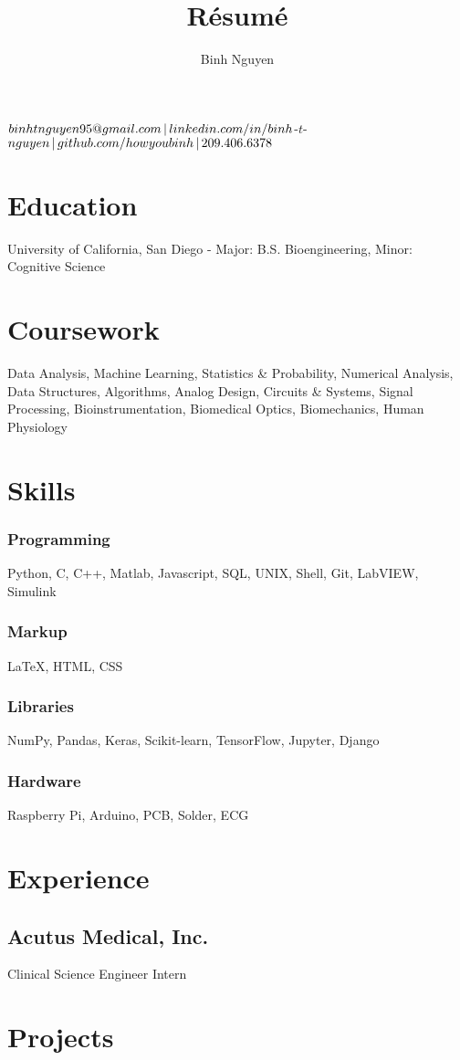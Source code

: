 \documentclass{article}
\makeatletter
\renewcommand{\maketitle}{
\begin{center}
{\huge\bfseries
\theauthor}

\vspace{0.25em}

$binhtnguyen95@gmail.com \thinspace\vert\thinspace
linkedin.com/in/binh$-$t$-$nguyen \thinspace\vert\thinspace 
github.com/howyoubinh \thinspace\vert\thinspace 
209.406.6378$

\end{center}
}
\makeatother
\begin{document}
\title{R\'esum\'e}
\author{Binh Nguyen}

\maketitle

\section{Education}

University of California, San Diego -
Major: B.S. Bioengineering,
Minor: Cognitive Science

\section{Coursework}
Data Analysis, 
Machine Learning,
Statistics \& Probability,
Numerical Analysis, 
Data Structures,
Algorithms,
Analog Design,
Circuits \& Systems,
Signal Processing,
Bioinstrumentation,
Biomedical Optics,
Biomechanics,
Human Physiology

\section{Skills}

\subsubsection{Programming}

Python, C, C++, Matlab, Javascript, SQL, UNIX, Shell, Git, LabVIEW, Simulink

\subsubsection{Markup}

{\LaTeX}, HTML, CSS

\subsubsection{Libraries}
NumPy, Pandas, Keras, Scikit-learn, TensorFlow, Jupyter, Django

\subsubsection{Hardware}
Raspberry Pi, Arduino, PCB, Solder, ECG

\section{Experience}

\subsection{Acutus Medical, Inc.}
Clinical Science Engineer Intern

\section{Projects}
\end{document}
